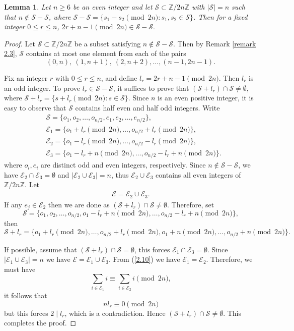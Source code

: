 \documentclass[11pt,reqno]{amsart}
\numberwithin{equation}{section}
\newtheorem{lemma}[theorem]{Lemma}
\begin{document}
\begin{lemma}\label{Lemma 2.2}
Let $n\geq6$ be an even integer and let $\mathcal{S}\subset \mathbb{Z}/2n\mathbb{Z}$ with $|\mathcal{S}|=n$ such that $n\not\in \mathcal{S}-\mathcal{S}$, where $\mathcal{S-S}=\{s_1-s_2\pmod{2n}: s_1,s_2\in \mathcal{S}\}$. Then for a fixed integer $0\leq r\leq n$, $2r+n-1\pmod{2n}\in \mathcal{S}-\mathcal{S}.$ 
\end{lemma}
\begin{proof} Let $\mathcal{S}\subset \mathbb{Z}/2n\mathbb{Z}$ be a subset satisfying $n\not\in \mathcal{S}-\mathcal{S}$. Then by Remark \ref{remark 2.3}, $\mathcal{S}$ contains at most one element from each of the pairs 
$$(0,n),~(1,n+1),~(2,n+2),\ldots,(n-1,2n-1).$$

Fix an integer $r$ with $0\leq r\leq n$, and define $l_{r}=2r+n-1\pmod{2n}.$
Then $l_r$ is an odd integer. To prove $l_{r}\in\mathcal{S}-\mathcal{S} $, it suffices to prove that $(\mathcal{S}+l_r)\cap\mathcal{S}\neq \emptyset$, where $\mathcal{S}+l_r=\{s+l_r \pmod{2n}: s\in \mathcal{S}\}$. Since $n$ is an even positive integer, it is easy to observe that  $\mathcal{S}$ contains half even and half odd integers. Write 
\begin{align*}
&\mathcal{S}=\{o_1,o_2,\ldots, o_{n/2},e_1,e_2,\ldots,e_{n/2}\},\\
   &\mathcal{E}_1=\{o_1+l_r\pmod{2n},\ldots, o_{n/2}+l_r\pmod{2n}\},\\ &\mathcal{E}_2=\{o_1-l_r\pmod{2n},\ldots,o_{n/2}-l_r\pmod{2n}\},\\ &\mathcal{E}_3=\{o_1-l_r+n\pmod{2n},\ldots,o_{n/2}-l_r+n\pmod{2n}\}.  
\end{align*}
 where $o_i,e_i$ are distinct odd and even integers, respectively. Since $n\not\in \mathcal{S}-\mathcal{S}$, we have $\mathcal{E}_2\cap \mathcal{E}_3=\emptyset$ and $|\mathcal{E}_2\cup \mathcal{E}_3|=n$, thus $\mathcal{E}_2\cup \mathcal{E}_3$ contains all even integers of $\mathbb{Z}/2n\mathbb{Z}$. Let
\begin{align}\label{2.10}
\mathcal{E}=\mathcal{E}_2\cup \mathcal{E}_3.      
 \end{align}
 If any $e_j\in \mathcal{E}_2$ then we are done as
$(\mathcal{S}+l_r)\cap\mathcal{S}\neq \emptyset$. Therefore, set $$\mathcal{S}=\{o_1,o_2,\ldots, o_{n/2},o_1-l_r+n\pmod{2n},\ldots,o_{n/2}-l_r+n\pmod{2n}\},$$    then $$\mathcal{S}+l_r=\{o_1+l_r\pmod{2n},\ldots, o_{n/2}+l_r\pmod{2n},o_1+n\pmod{2n},\ldots,o_{n/2}+n\pmod{2n}\}.$$    

If possible, assume that $(\mathcal{S}+l_r)\cap\mathcal{S} =\emptyset$, this forces $\mathcal{E}_1\cap \mathcal{E}_3=\emptyset$. Since $|\mathcal{E}_1\cup\mathcal{E}_3|=n$ we have $\mathcal{E}=\mathcal{E}_1\cup \mathcal{E}_3$. From (\ref{2.10}) we have $\mathcal{E}_1=\mathcal{E}_2$.
Therefore, we must have
$$
    \sum_{i\in \mathcal{E}_1} i\equiv \sum_{i\in \mathcal{E}_2}i\pmod{2n},
$$
it follows that
$$nl_r\equiv 0\pmod{2n}$$
but this forces $2\mid l_r$, which is a contradiction. Hence $( \mathcal{S}+l_r)\cap\mathcal{S}\neq \emptyset$. This completes the proof.
\end{proof}
\end{document}
